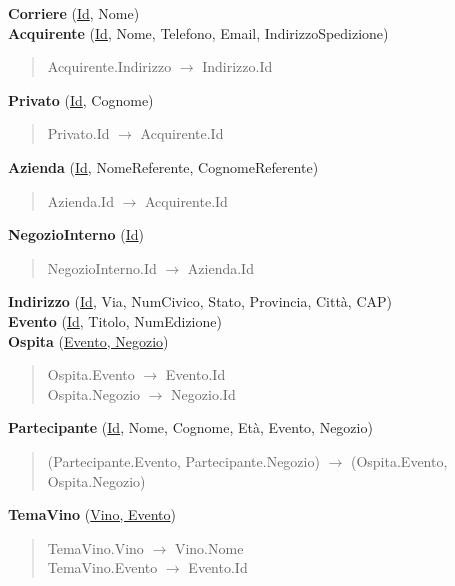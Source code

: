 \textbf{Corriere} (\underline{Id}, Nome)\\
\textbf{Acquirente} (\underline{Id}, Nome, Telefono, Email, IndirizzoSpedizione)
\begin{verse}
	Acquirente.Indirizzo $\to$ Indirizzo.Id
\end{verse} 
\textbf{Privato} (\underline{Id}, Cognome)
\begin{verse}
	Privato.Id $\to$ Acquirente.Id
\end{verse} 
\textbf{Azienda} (\underline{Id}, NomeReferente, CognomeReferente)
\begin{verse}
	Azienda.Id $\to$ Acquirente.Id
\end{verse} 
\textbf{NegozioInterno} (\underline{Id})
\begin{verse}
	NegozioInterno.Id $\to$ Azienda.Id
\end{verse} 
\textbf{Indirizzo} (\underline{Id}, Via, NumCivico, Stato, Provincia, Città, CAP)\\
\textbf{Evento} (\underline{Id}, Titolo, NumEdizione)\\
\textbf{Ospita} (\underline{Evento, Negozio})
\begin{verse}
	Ospita.Evento $\to$ Evento.Id\\
	Ospita.Negozio $\to$ Negozio.Id
\end{verse} 
\textbf{Partecipante} (\underline{Id}, Nome, Cognome, Età, Evento, Negozio)
\begin{verse}
	(Partecipante.Evento, Partecipante.Negozio) $\to$ (Ospita.Evento, Ospita.Negozio)
\end{verse} 
\textbf{TemaVino} (\underline{Vino, Evento})
\begin{verse}
	TemaVino.Vino $\to$ Vino.Nome\\
	TemaVino.Evento $\to$ Evento.Id
\end{verse} 